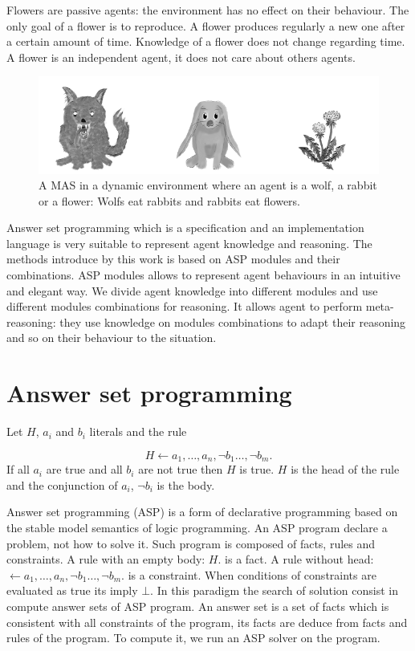 \documentclass{aamas2012}
\begin{document}
	Flowers are passive agents: the environment has no effect on their behaviour.
	The only goal of a flower is to reproduce.
	A flower produces regularly a new one after a certain amount of time.
	Knowledge of a flower does not change regarding time.
	A flower is an independent agent, it does not care about others agents.

	\begin{figure}
		\centering
		\includegraphics[keepaspectratio=true,scale=3.0]{food_chain.png}
		\caption
		{
			\label{food_chain}
			A MAS in a dynamic environment where an agent is a wolf, a rabbit or a flower:
			Wolfs eat rabbits and rabbits eat flowers.
		}
	\end{figure}
	
	Answer set programming which is a specification and an implementation language is very suitable to represent agent knowledge and reasoning.
	The methods introduce by this work is based on ASP modules and their combinations.
	ASP modules allows to represent agent behaviours in an intuitive and elegant way.
	We divide agent knowledge into different modules and use different modules combinations for reasoning.
	It allows agent to perform meta-reasoning: they use knowledge on modules combinations to adapt their reasoning and so on their behaviour to the situation.

\section{Answer set programming}

	\begin{definition}[Rule]
		Let $H$, $a_{i}$ and $b_{i}$ literals and the rule
	
					$$H \leftarrow a_{1}, \ldots , a_{n}, \neg b_{1} \ldots, \neg b_{m}.$$
		If all $a_{i}$ are true and all $b_{i}$ are not true then $H$ is true.
		$H$ is the head of the rule and the conjunction of $a_{i}$, $\neg b_{i}$ is the body.
	\end{definition}

	Answer set programming (ASP) is a form of declarative programming based on the stable model semantics of logic programming.
	An ASP program declare a problem, not how to solve it.
	Such program is composed of facts, rules and constraints. 
	A rule with an empty body: $H.$ is a fact.
	A rule without head: $\leftarrow a_{1}, \ldots , a_{n}, \neg b_{1} \ldots, \neg b_{m}.$ is a constraint.
	When conditions of constraints are evaluated as true its imply $\bot$.
	In this paradigm the search of solution consist in compute answer sets of ASP program.
	An answer set is a set of facts which is consistent with all constraints of the program, its facts are deduce from facts and rules of the program.
	To compute it, we run an ASP solver on the program.
	
\end{document}

